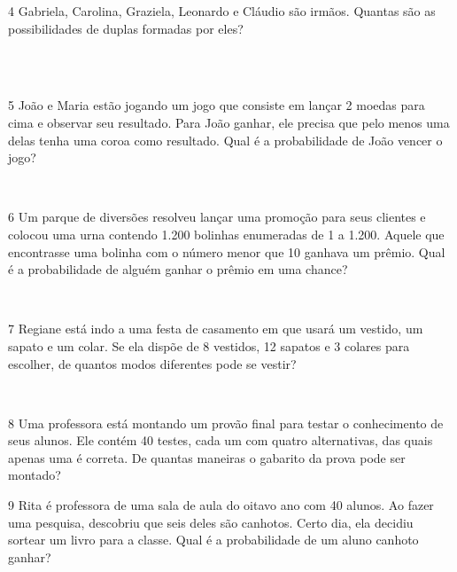 \num{4} Gabriela, Carolina, Graziela, Leonardo e Cláudio são irmãos. Quantas são
as possibilidades de duplas formadas por eles?

\\
\\

\num{5} João e Maria estão jogando um jogo que consiste em lançar 2 moedas
para cima e observar seu resultado. Para João ganhar, ele precisa que
pelo menos uma delas tenha uma coroa como resultado. Qual é a
probabilidade de João vencer o jogo?

\\

\num{6} Um parque de diversões resolveu lançar uma promoção para seus
clientes e colocou uma urna contendo 1.200 bolinhas enumeradas de 1 a
1.200. Aquele que encontrasse uma bolinha com o número menor que 10
ganhava um prêmio. Qual é a probabilidade de alguém ganhar o prêmio em
uma chance?

\\

\num{7} Regiane está indo a uma festa de casamento em que usará um
vestido, um sapato e um colar. Se ela dispõe de 8 vestidos, 12 sapatos e
3 colares para escolher, de quantos modos diferentes pode se vestir?

\\

\num{8} Uma professora está montando um provão final para testar o
conhecimento de seus alunos. Ele contém 40 testes, cada um com quatro
alternativas, das quais apenas uma é correta. De quantas maneiras o
gabarito da prova pode ser montado?


\num{9} Rita é professora de uma sala de aula do oitavo ano com 40 alunos. Ao
fazer uma pesquisa, descobriu que seis deles são canhotos. Certo dia, ela
decidiu sortear um livro para a classe. Qual é a probabilidade de um
aluno canhoto ganhar?


